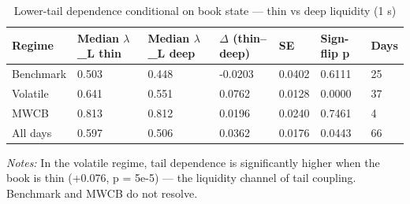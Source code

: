 \begin{table}[htbp]\centering
\caption{Lower-tail dependence conditional on book state — thin vs deep liquidity (1 s)}
\label{tab:t11b}
\small
\begin{tabular}{lllllll}
\toprule
Regime & Median $\lambda$\_L thin & Median $\lambda$\_L deep & $\Delta$ (thin--deep) & SE & Sign-flip p & Days \\
\midrule
Benchmark & 0.503 & 0.448 & -0.0203 & 0.0402 & 0.6111 & 25 \\
Volatile & 0.641 & 0.551 & 0.0762 & 0.0128 & 0.0000 & 37 \\
MWCB & 0.813 & 0.812 & 0.0196 & 0.0240 & 0.7461 & 4 \\
All days & 0.597 & 0.506 & 0.0362 & 0.0176 & 0.0443 & 66 \\
\bottomrule
\end{tabular}
\begin{minipage}{\linewidth}\vspace{2pt}\footnotesize\emph{Notes:} In the volatile regime, tail dependence is significantly higher when the book is thin (+0.076, p = 5e-5) — the liquidity channel of tail coupling. Benchmark and MWCB do not resolve.\end{minipage}
\end{table}
